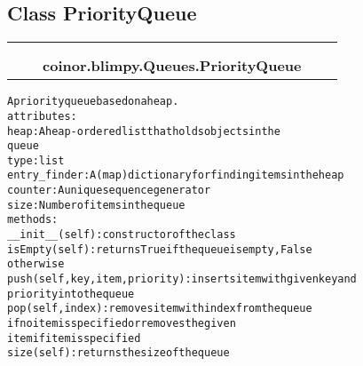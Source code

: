 

\subsection{Class PriorityQueue}

    \label{coinor:blimpy:Queues:PriorityQueue}
\begin{tabular}{cccccc}
\multicolumn{2}{r}{\settowidth{\BCL}{object}\multirow{2}{\BCL}{object}}
&&
  \\\cline{3-3}
  &&\multicolumn{1}{c|}{}
&&
  \\
&&\multicolumn{2}{l}{\textbf{coinor.blimpy.Queues.PriorityQueue}}
\end{tabular}

\begin{alltt}

A priority queue based on a heap.
attributes:
    heap:                  A heap-ordered list that holds objects in the
                           queue
                           type: list
    entry\_finder:          A (map) dictionary for finding items in the heap
    counter:               A unique sequence generator
    size:                  Number of items in the queue
methods:
    \_\_init\_\_(self):        constructor of the class
    isEmpty(self):         returns True if the queue is empty, False
                           otherwise
    push(self,key,item,priority): inserts item with given key and 
                           priority into the queue
    pop(self,index):       removes item with index from the queue
                           if no item is specified or removes the given
                           item if item is specified
    size(self):            returns the size of the queue
\end{alltt}



